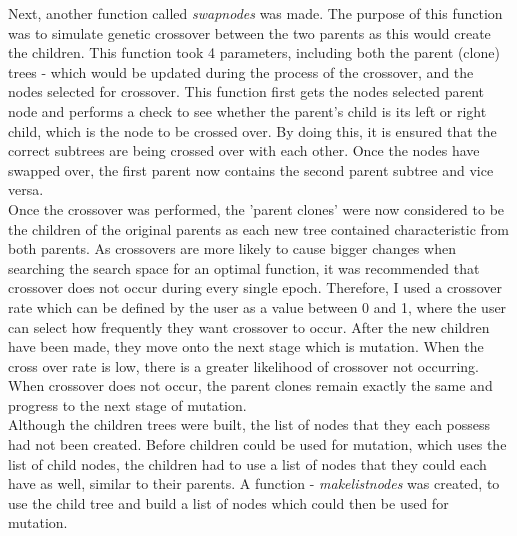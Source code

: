 \documentclass[11pt]{article}
\begin{document}
Next, another function called \textit{swap\textunderscore nodes} was made. The purpose of this function was to simulate genetic crossover between the two parents as this would create the children. This function took 4 parameters, including both the parent (clone) trees - which would be updated during the process of the crossover, and the nodes selected for crossover. This function first gets the nodes selected parent node and performs a check to see whether the parent's child is its left or right child, which is the node to be crossed over. By doing this, it is ensured that the correct subtrees are being crossed over with each other. Once the nodes have swapped over, the first parent now contains the second parent subtree and vice versa. \\

Once the crossover was performed, the 'parent clones' were now considered to be the children of the original parents as each new tree contained characteristic from both parents. As crossovers are more likely to cause bigger changes when searching the search space for an optimal function, it was recommended that crossover does not occur during every single epoch. Therefore, I used a crossover rate which can be defined by the user as a value between 0 and 1, where the user can select how frequently they want crossover to occur. After the new children have been made, they move onto the next stage which is mutation.  When the cross over rate is low, there is a greater likelihood of crossover not occurring. When crossover does not occur, the parent clones remain exactly the same and progress to the next stage of mutation. \\

Although the children trees were built, the list of nodes that they each possess had not been created. Before children could be used for mutation, which uses the list of child nodes, the children had to use a list of nodes that they could each have as well, similar to their parents. A function - \textit{make\textunderscore list\textunderscore nodes} was created, to use the child tree and build a list of nodes which could then be used for mutation. \\
\end{document}

